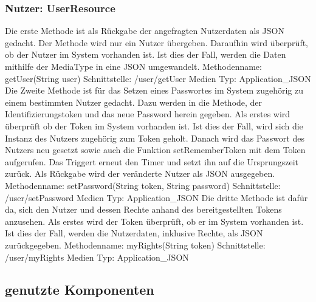 \documentclass[german]{book}
\begin{document}
\subsubsection{Nutzer: UserResource}
Die erste Methode ist als Rückgabe der angefragten Nutzerdaten als JSON gedacht. Der Methode wird nur ein Nutzer übergeben. Daraufhin wird überprüft, ob der Nutzer im System vorhanden ist. Ist dies der Fall, werden die Daten mithilfe der MediaType in eine JSON umgewandelt. 
\newline
Methodenname: getUser(String user)
\newline
Schnittstelle: /user/getUser
\newline
Medien Typ: Application\_JSON
\newline
\newline
Die Zweite Methode ist für das Setzen eines Passwortes im System zugehörig zu einem bestimmten Nutzer gedacht. Dazu werden in die Methode, der Identifizierungstoken und das neue Password herein gegeben. Als erstes wird überprüft ob der Token im System vorhanden ist. Ist dies der Fall, wird sich die Instanz des Nutzers zugehörig zum Token geholt. Danach wird das Passwort des Nutzers neu gesetzt sowie auch die Funktion setRememberToken mit dem Token aufgerufen. Das Triggert erneut den Timer und setzt ihn auf die Ursprungszeit zurück. Als Rückgabe wird der veränderte Nutzer als JSON ausgegeben.
\newline
Methodenname: setPassword(String token, String password)
\newline
Schnittstelle: /user/setPassword
\newline
Medien Typ: Application\_JSON
\newline
\newline
Die dritte Methode ist dafür da, sich den Nutzer und dessen Rechte anhand des bereitgestellten Tokens anzusehen. Als erstes wird der Token überprüft, ob er im System vorhanden ist. Ist dies der Fall, werden die Nutzerdaten, inklusive Rechte, als JSON zurückgegeben. 
\newline
Methodenname: myRights(String token)
\newline
Schnittstelle: /user/myRights
\newline
Medien Typ: Application\_JSON
\newline
\newline

\subsection{genutzte Komponenten}
\end{document}

